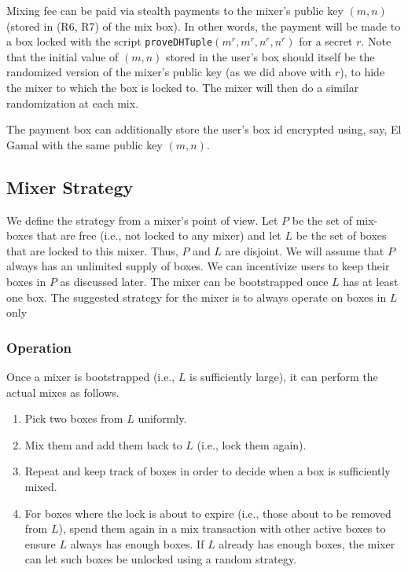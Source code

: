 \documentclass[runningheads]{llncs}
\begin{document}
Mixing fee can be paid via stealth payments to the mixer's public key $(m, n)$ (stored in (R6, R7) of the mix box).
In other words, the payment will be made to a box locked with the script \texttt{proveDHTuple}$(m^r, m^r, n^r, n^r)$ for a secret $r$.
Note that the initial value of $(m, n)$ stored in the user's box should itself be the randomized version of the mixer's public key
(as we did above with $r$), to hide the mixer to which the box is locked to. The mixer will then do a similar randomization at each mix.

The payment box can additionally store the user's box id encrypted using, say, El Gamal with the same public key $(m, n)$.

\subsection{Mixer Strategy}

We define the strategy from a mixer's point of view. Let $P$ be the set of mix-boxes that are free (i.e., not locked to any mixer) and let $L$ be the set of boxes that are locked to this mixer. Thus, $P$ and $L$ are disjoint. We will assume that $P$ always has an unlimited supply of boxes. We can incentivize users to keep their boxes in $P$ as discussed later. The mixer can be bootstrapped once $L$ has at least one box. The suggested strategy for the mixer is to always operate on boxes in $L$ only

\subsubsection{Operation}

Once a mixer is bootstrapped (i.e., $L$ is sufficiently large), it can perform the actual mixes as follows.
\begin{enumerate}
\item Pick two boxes from $L$ uniformly.
\item Mix them and add them back to $L$ (i.e., lock them again).
\item Repeat and keep track of boxes in order to decide when a box is sufficiently mixed.
\item For boxes where the lock is about to expire (i.e., those about to be removed from $L$),
spend them again in a mix transaction with other active boxes to ensure $L$ always has enough boxes.
If $L$ already has enough boxes, the mixer can let such boxes be unlocked using a random strategy.

\end{enumerate}
\end{document}

